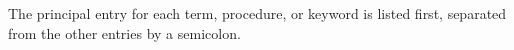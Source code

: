 \documentclass{algol60}
\begin{document}













\appendix






\renewcommand{\bibname}{References}
	\par

\begin{theindex}

The principal entry for each term, procedure, or keyword is listed
first, separated from the other entries by a semicolon.


\end{theindex}
\end{document}
